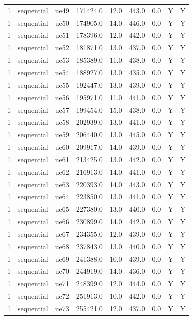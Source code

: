 \begin{table}[ht]
\begin{tabular}{|c|c|c|c|c|c|c|c|c|}
1 & sequential & ue49 & 171424.0 & 12.0 & 443.0 & 0.0 & Y & Y \\
1 & sequential & ue50 & 174905.0 & 14.0 & 446.0 & 0.0 & Y & Y \\
1 & sequential & ue51 & 178396.0 & 12.0 & 442.0 & 0.0 & Y & Y \\
1 & sequential & ue52 & 181871.0 & 13.0 & 437.0 & 0.0 & Y & Y \\
1 & sequential & ue53 & 185389.0 & 11.0 & 438.0 & 0.0 & Y & Y \\
1 & sequential & ue54 & 188927.0 & 13.0 & 435.0 & 0.0 & Y & Y \\
1 & sequential & ue55 & 192447.0 & 13.0 & 439.0 & 0.0 & Y & Y \\
1 & sequential & ue56 & 195971.0 & 11.0 & 441.0 & 0.0 & Y & Y \\
1 & sequential & ue57 & 199454.0 & 15.0 & 438.0 & 0.0 & Y & Y \\
1 & sequential & ue58 & 202939.0 & 13.0 & 441.0 & 0.0 & Y & Y \\
1 & sequential & ue59 & 206440.0 & 13.0 & 445.0 & 0.0 & Y & Y \\
1 & sequential & ue60 & 209917.0 & 14.0 & 439.0 & 0.0 & Y & Y \\
1 & sequential & ue61 & 213425.0 & 13.0 & 442.0 & 0.0 & Y & Y \\
1 & sequential & ue62 & 216913.0 & 14.0 & 441.0 & 0.0 & Y & Y \\
1 & sequential & ue63 & 220393.0 & 14.0 & 443.0 & 0.0 & Y & Y \\
1 & sequential & ue64 & 223850.0 & 13.0 & 441.0 & 0.0 & Y & Y \\
1 & sequential & ue65 & 227380.0 & 13.0 & 440.0 & 0.0 & Y & Y \\
1 & sequential & ue66 & 230899.0 & 14.0 & 442.0 & 0.0 & Y & Y \\
1 & sequential & ue67 & 234355.0 & 12.0 & 439.0 & 0.0 & Y & Y \\
1 & sequential & ue68 & 237843.0 & 13.0 & 440.0 & 0.0 & Y & Y \\
1 & sequential & ue69 & 241388.0 & 10.0 & 439.0 & 0.0 & Y & Y \\
1 & sequential & ue70 & 244919.0 & 14.0 & 436.0 & 0.0 & Y & Y \\
1 & sequential & ue71 & 248399.0 & 12.0 & 444.0 & 0.0 & Y & Y \\
1 & sequential & ue72 & 251913.0 & 10.0 & 442.0 & 0.0 & Y & Y \\
1 & sequential & ue73 & 255421.0 & 12.0 & 437.0 & 0.0 & Y & Y \\

\end{tabular}
\end{table}

